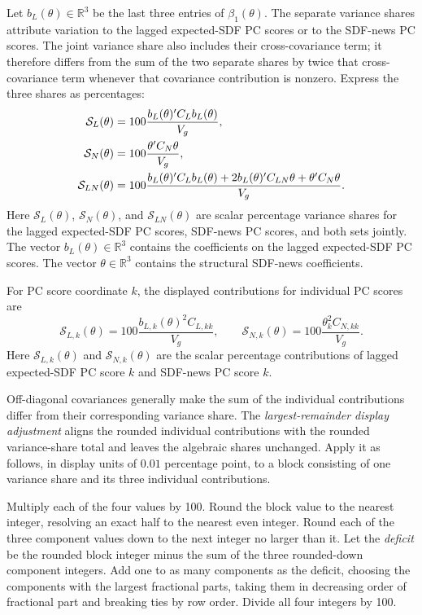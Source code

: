 \documentclass[11pt]{article}
\begin{document}
Let \(b_L(\theta)\in\mathbb R^3\) be the last three entries of
\(\beta_1(\theta)\). The separate variance shares attribute variation to the lagged expected-SDF PC
scores or to the SDF-news PC scores. The joint variance share also includes their cross-covariance
term; it therefore differs from the sum of the two separate shares by twice that cross-covariance
term whenever that covariance contribution is nonzero. Express the three shares as percentages:
\begin{align}
 \mathcal S_L(\theta)&=100\frac{b_L(\theta)'C_Lb_L(\theta)}{V_g},\notag\\
 \mathcal S_N(\theta)&=100\frac{\theta'C_N\theta}{V_g},\notag\\
 \mathcal S_{LN}(\theta)&=100\frac{b_L(\theta)'C_Lb_L(\theta)
 +2b_L(\theta)'C_{LN}\theta+\theta'C_N\theta}{V_g}.
 \label{eq:share-combined}
\end{align}
Here \(\mathcal S_L(\theta)\), \(\mathcal S_N(\theta)\), and
\(\mathcal S_{LN}(\theta)\) are scalar percentage variance shares for the lagged expected-SDF PC
scores, SDF-news PC scores, and both sets jointly. The vector \(b_L(\theta)\in\mathbb R^3\) contains
the coefficients on the lagged expected-SDF PC scores. The vector \(\theta\in\mathbb R^3\) contains
the structural SDF-news coefficients.

For PC score coordinate \(k\), the displayed contributions for individual PC scores are
\begin{equation*}
 \mathcal S_{L,k}(\theta)=100\frac{b_{L,k}(\theta)^2C_{L,kk}}{V_g},
 \qquad
 \mathcal S_{N,k}(\theta)=100\frac{\theta_k^2C_{N,kk}}{V_g}.
\end{equation*}
Here \(\mathcal S_{L,k}(\theta)\) and \(\mathcal S_{N,k}(\theta)\) are the scalar percentage
contributions of lagged expected-SDF PC score \(k\) and SDF-news PC score \(k\).

Off-diagonal covariances generally make the sum of the individual contributions differ from their
corresponding variance share. The \emph{largest-remainder display adjustment} aligns the rounded
individual contributions with the rounded variance-share total and leaves the algebraic shares
unchanged. Apply it as follows, in display units of \(0.01\) percentage point, to a block consisting
of one variance share and its three individual contributions.

Multiply each of the four values by 100. Round the block value to the nearest integer, resolving an
exact half to the nearest even integer. Round each of the three component values down to the next
integer no larger than it. Let the \emph{deficit} be the rounded block integer minus the sum of the
three rounded-down component integers. Add one to as many components as the deficit, choosing the components with the largest
fractional parts, taking them in decreasing order of fractional part and breaking ties by row order.
Divide all four integers by 100.
\end{document}
